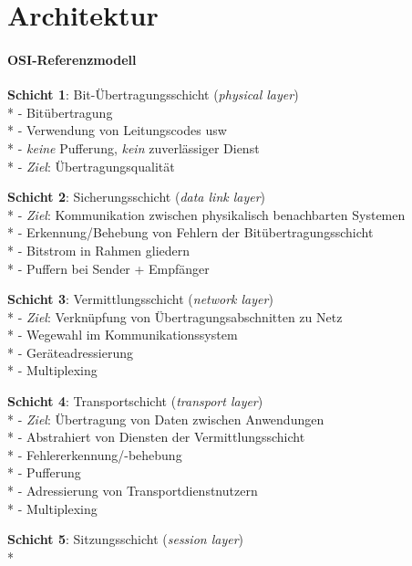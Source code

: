 \section{Architektur}

\paragraph{OSI-Referenzmodell}
\begin{items}
  \item \textbf{Schicht 1}: Bit-Übertragungsschicht (\emph{physical layer}) \\*
    - Bitübertragung \\*
    - Verwendung von Leitungscodes usw \\*
    - \emph{keine} Pufferung, \emph{kein} zuverlässiger Dienst \\*
    - \emph{Ziel}: Übertragungsqualität
  \item \textbf{Schicht 2}: Sicherungsschicht (\emph{data link layer}) \\*
    - \emph{Ziel}: Kommunikation zwischen physikalisch benachbarten Systemen \\*
    - Erkennung/Behebung von Fehlern der Bitübertragungsschicht \\*
    - Bitstrom in Rahmen gliedern \\*
    - Puffern bei Sender + Empfänger
  \item \textbf{Schicht 3}: Vermittlungsschicht (\emph{network layer}) \\*
    - \emph{Ziel}: Verknüpfung von Übertragungsabschnitten zu Netz \\*
    - Wegewahl im Kommunikationssystem \\*
    - Geräteadressierung \\*
    - Multiplexing
  \item \textbf{Schicht 4}: Transportschicht (\emph{transport layer}) \\*
    - \emph{Ziel}: Übertragung von Daten zwischen Anwendungen \\*
    - Abstrahiert von Diensten der Vermittlungsschicht \\*
    - Fehlererkennung/-behebung \\*
    - Pufferung \\*
    - Adressierung von Transportdienstnutzern \\*
    - Multiplexing
  \item \textbf{Schicht 5}: Sitzungsschicht (\emph{session layer}) \\*

\end{items}
